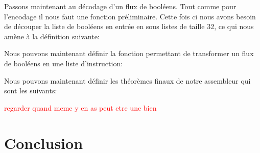 \documentclass {article}
\newcommand{\codefrom}[3]
           {}
\theoremstyle{definition}
\theoremstyle{remark}
\newcommand{\todo}[1]{\textcolor{red}{#1}}
\begin{document}
\codefrom{src}{encode}{encode_flux}

Passons maintenant au décodage d'un flux de booléens. Tout comme pour l'encodage il nous faut
une fonction préliminaire. Cette fois ci nous avons besoin de découper la liste de booléens
en entrée en sous listes de taille 32, ce qui nous amène à la définition suivante:

\codefrom{src}{encode}{cut_32}

Nous pouvons maintenant définir la fonction permettant de transformer un flux de booléens
en une liste d'instruction:

\codefrom{src}{encode}{decode_flux}



Nous pouvons maintenant définir les théorèmes finaux de notre assembleur qui sont les suivants:

\codefrom{src}{encode}{encode_decode_flux_decoup}

\codefrom{src}{encode}{decode_flux_decoup_encode}

\todo{regarder quand meme y en as peut etre une bien}



\section{Conclusion}
\end{document}
